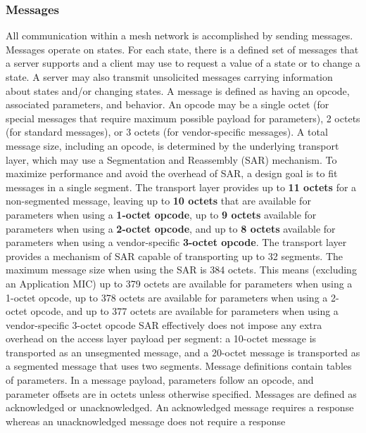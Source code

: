 \documentclass[\main/main.tex]{subfiles}
\begin{document}
\subsubsection{Messages}
All communication within a mesh network is accomplished by sending messages. Messages operate on states. For each state, there is a defined set of messages that a server supports and a client may use to request a value of a state or to change a state. A server may also transmit unsolicited messages carrying information about states and/or changing states.
\newline\newline
A message is defined as having an opcode, associated parameters, and behavior. An opcode may be a single octet (for special messages that require maximum possible payload for parameters), 2 octets (for standard messages), or 3 octets (for vendor-specific messages).
\newline\newline
A total message size, including an opcode, is determined by the underlying transport layer, which may use a Segmentation and Reassembly (SAR) mechanism. To maximize performance and avoid the overhead of SAR, a design goal is to fit messages in a single segment. The transport layer provides up to \textbf{11 octets} for a non-segmented message, leaving up to \textbf{10 octets} that are available for parameters when using a \textbf{1-octet opcode}, up to \textbf{9 octets} available for parameters when using a \textbf{2-octet opcode}, and up to \textbf{8 octets} available for parameters when using a vendor-specific \textbf{3-octet opcode}.
\newline\newline
The transport layer provides a mechanism of SAR capable of transporting up to 32 segments. The maximum message size when using the SAR is 384 octets. This means (excluding an Application MIC) up to 379 octets are available for parameters when using a 1-octet opcode, up to 378 octets are available for parameters when using a 2-octet opcode, and up to 377 octets are available for parameters when using a vendor-specific 3-octet opcode
\newline\newline
SAR effectively does not impose any extra overhead on the access layer payload per segment: a 10-octet message is transported as an unsegmented message, and a 20-octet message is transported as a segmented message that uses two segments.
\newline\newline
Message definitions contain tables of parameters. In a message payload, parameters follow an opcode, and parameter offsets are in octets unless otherwise specified.
\newline\newline
Messages are defined as acknowledged or unacknowledged. An acknowledged message requires a response whereas an unacknowledged message does not require a response
\end{document}
